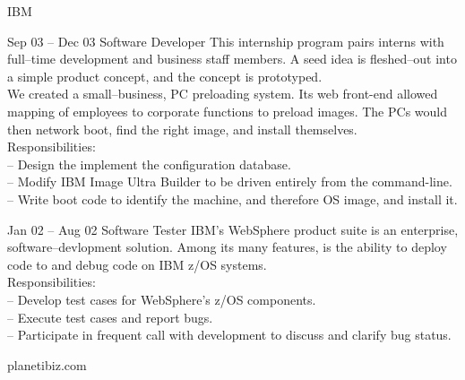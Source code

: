 \documentclass[letterpaper, 11pt]{article}
\begin{document}
\begin{resume}
\begin{block}
\begin{category}{IBM}
                \smallskip
            \end{category}
            \begin{subcategory}{Sep 03 -- Dec 03}
                 {Software Developer}
                This internship program pairs interns with full--time development and
                business staff members.  A seed idea is fleshed--out into a simple
                product concept, and the concept is prototyped.
                \\[1ex]
                We created a small--business, PC preloading system.  Its web front-end allowed
                mapping of employees to corporate functions to preload images.  The PCs would
                then network boot, find the right image, and install themselves.
                \\[1ex]
                Responsibilities: \\
                -- Design the implement the configuration database. \\
                -- Modify IBM Image Ultra Builder to be driven entirely from the command-line. \\
                -- Write boot code to identify the machine, and therefore OS image, and install it.
                \bigskip
            \end{subcategory}
            \begin{subcategory}{Jan 02 -- Aug 02}
                 {Software Tester}
                IBM's WebSphere product suite is an enterprise, software--devlopment solution.  Among
                its many features, is the ability to deploy code to and debug code on IBM z/OS systems.
                \\[1ex]
                Responsibilities: \\
                -- Develop test cases for WebSphere's z/OS components. \\
                -- Execute test cases and report bugs. \\
                -- Participate in frequent call with development to discuss and clarify bug status.
                \bigskip
                \bigskip
            \end{subcategory}
        \end{block}
        \begin{block}
            \begin{category}{planetibiz.com}
                  {}
                \smallskip

\end{category}
\end{block}
\end{resume}
\end{document}
